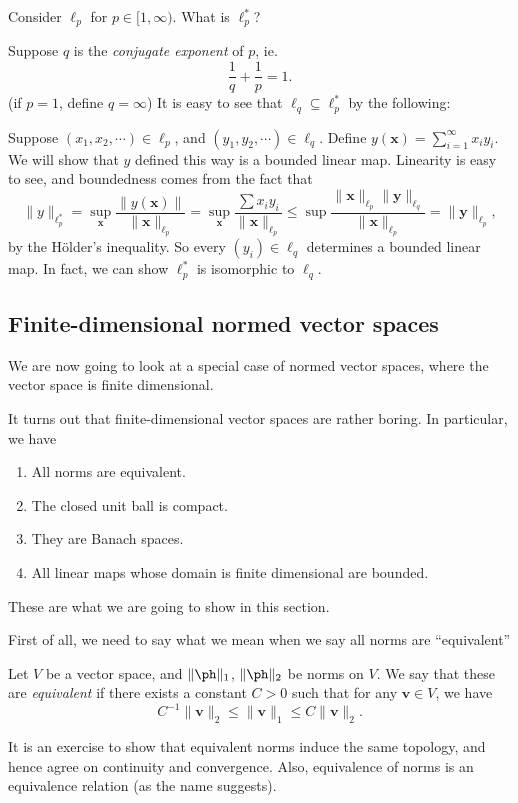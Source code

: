 \documentclass[a4paper]{article}
\begin{document}
\begin{eg}
  Consider $\ell_p$ for $p\in [1, \infty)$. What is $\ell_p^*$?

    Suppose $q$ is the \emph{conjugate exponent} of $p$, ie.
    \[
      \frac{1}{q} + \frac{1}{p} = 1.
    \]
    (if $p = 1$, define $q = \infty$) It is easy to see that $\ell_q \subseteq \ell_p^*$ by the following:

    Suppose $(x_1, x_2, \cdots) \in \ell_p$, and $(y_1, y_2, \cdots)\in \ell_q$. Define $y(\mathbf{x}) = \sum_{i = 1}^\infty x_i y_i$. We will show that $y$ defined this way is a bounded linear map. Linearity is easy to see, and boundedness comes from the fact that
    \[
      \|y\|_{\ell_p^*} = \sup_{\mathbf{x}}\frac{\|y(\mathbf{x})\|}{\|\mathbf{x}\|_{\ell_p}} = \sup_{\mathbf{x}} \frac{\sum x_i y_i}{\|\mathbf{x}\|_{\ell_p}} \leq \sup \frac{\|\mathbf{x}\|_{\ell_p}\|\mathbf{y}\|_{\ell_q}}{\|\mathbf{x}\|_{\ell_p}} = \|\mathbf{y}\|_{\ell_p},
    \]
    by the H\"older's inequality. So every $(y_i) \in \ell_q$ determines a bounded linear map. In fact, we can show $\ell_p^*$ is isomorphic to $\ell_q$.
\end{eg}

\subsection{Finite-dimensional normed vector spaces}
We are now going to look at a special case of normed vector spaces, where the vector space is finite dimensional.

It turns out that finite-dimensional vector spaces are rather boring. In particular, we have
\begin{enumerate}
  \item All norms are equivalent.
  \item The closed unit ball is compact.
  \item They are Banach spaces.
  \item All linear maps whose domain is finite dimensional are bounded.
\end{enumerate}
These are what we are going to show in this section.

First of all, we need to say what we mean when we say all norms are ``equivalent''
\begin{defi}
  Let $V$ be a vector space, and $\|\ph \|_1$, $\|\ph \|_2$ be norms on $V$. We say that these are \emph{equivalent} if there exists a constant $C > 0$ such that for any $\mathbf{v}\in V$, we have
  \[
    C^{-1}\|\mathbf{v}\|_2 \leq \|\mathbf{v}\|_1 \leq C\|\mathbf{v}\|_2.
  \]
\end{defi}
It is an exercise to show that equivalent norms induce the same topology, and hence agree on continuity and convergence. Also, equivalence of norms is an equivalence relation (as the name suggests).
\end{document}
